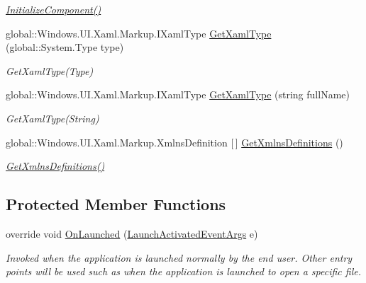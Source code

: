 \begin{DoxyCompactItemize}
\begin{DoxyCompactList}\small\item\em \hyperlink{class_i_v_s_calc_1_1_app_a52893841ad75312381695e5fae721452}{Initialize\+Component()} \end{DoxyCompactList}\item 
global\+::\+Windows.\+U\+I.\+Xaml.\+Markup.\+I\+Xaml\+Type \hyperlink{class_i_v_s_calc_1_1_app_aef34fbc14d2a7b2c647dd5e7b8252cb8}{Get\+Xaml\+Type} (global\+::\+System.\+Type type)
\begin{DoxyCompactList}\small\item\em Get\+Xaml\+Type(\+Type) \end{DoxyCompactList}\item 
global\+::\+Windows.\+U\+I.\+Xaml.\+Markup.\+I\+Xaml\+Type \hyperlink{class_i_v_s_calc_1_1_app_a0ecb22e44dc1f88762844f47b18f2e7b}{Get\+Xaml\+Type} (string full\+Name)
\begin{DoxyCompactList}\small\item\em Get\+Xaml\+Type(\+String) \end{DoxyCompactList}\item 
global\+::\+Windows.\+U\+I.\+Xaml.\+Markup.\+Xmlns\+Definition \mbox{[}$\,$\mbox{]} \hyperlink{class_i_v_s_calc_1_1_app_a8f8ce062718726306de29d798b53bdba}{Get\+Xmlns\+Definitions} ()
\begin{DoxyCompactList}\small\item\em \hyperlink{class_i_v_s_calc_1_1_app_a8f8ce062718726306de29d798b53bdba}{Get\+Xmlns\+Definitions()} \end{DoxyCompactList}\end{DoxyCompactItemize}
\subsection*{Protected Member Functions}
\begin{DoxyCompactItemize}
\item 
override void \hyperlink{class_i_v_s_calc_1_1_app_aef59f7ba3edf598f6f3f5dbaf81b4350}{On\+Launched} (\hyperlink{class_windows_1_1_application_model_1_1_activation_1_1_launch_activated_event_args}{Launch\+Activated\+Event\+Args} e)
\begin{DoxyCompactList}\small\item\em Invoked when the application is launched normally by the end user. Other entry points will be used such as when the application is launched to open a specific file. \end{DoxyCompactList}\end{DoxyCompactItemize}



